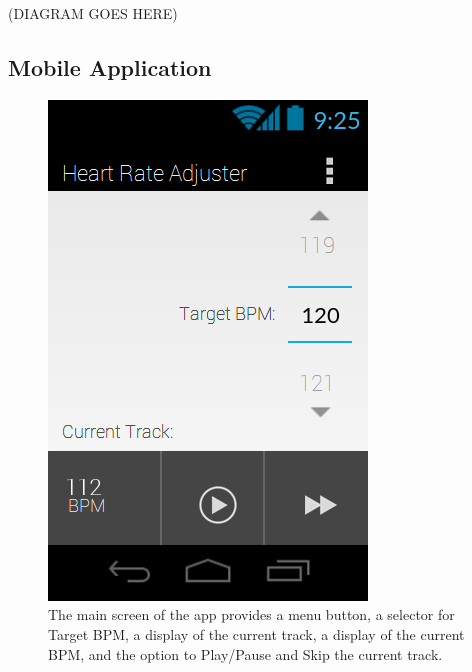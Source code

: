\documentclass[letterpaper,english]{scrreprt}
\begin{document}
(DIAGRAM GOES HERE)
\subsection{Mobile Application}

\begin{figure}[H]
	\centering
	\includegraphics{mobile_ui/1.png}
	\caption{The main screen of the app provides a menu button, a selector for Target BPM, a display of the current track, a display of the current BPM, and the option to Play/Pause and Skip the current track.}
\end{figure}
\end{document}
